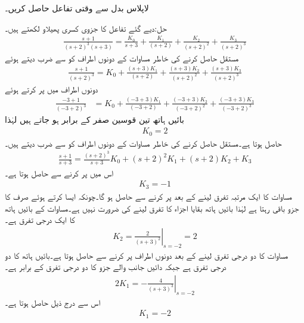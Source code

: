 لاپلاس بدل  سے وقتی تفاعل حاصل کریں۔

حل:دیے گئے تفاعل کا جزوی کسری پھیلاو لکھتے ہیں۔
\begin{align}\label{مساوات_لاپلاس_مثال_کثیر_قطبین_الف}
\frac{s+1}{(s+2)^3(s+3)}=\frac{K_0}{s+3}+\frac{K_1}{(s+2)}+\frac{K_2}{(s+2)^2}+\frac{K_3}{(s+2)^3}
\end{align}
مستقل  حاصل کرنے کی خاطر مساوات کے دونوں اطراف کو  سے ضرب دیتے ہوئے
\begin{align*}
\frac{s+1}{(s+2)^3}=K_0+\frac{(s+3)K_1}{(s+2)}+\frac{(s+3)K_2}{(s+2)^2}+\frac{(s+3)K_3}{(s+2)^3}
\end{align*}
دونوں اطراف میں  پر کرتے ہوئے
\begin{align*}
\frac{-3+1}{(-3+2)^3}&=K_0+\frac{(-3+3)K_1}{(-3+2)}+\frac{(-3+3)K_2}{(-3+2)^2}+\frac{(-3+3)K_3}{(-3+2)^3}
\end{align*}
 بائیں ہاتھ تین قوسین صفر کے برابر ہو جاتے ہیں لہٰذا
\begin{align*}
K_0=2
\end{align*}
حاصل ہوتا ہے۔مستقل  حاصل کرنے کی خاطر مساوات  کے دونوں اطراف کو  سے ضرب دیتے ہیں۔
\begin{align}\label{مساوات_لاپلاس_مثال_کثیر_قطبین_ب}
\frac{s+1}{s+3}=\frac{(s+2)^3}{s+3}K_0+(s+2)^2 K_1+(s+2)K_2+K_3
\end{align}
اس میں  پر کرنے سے  حاصل ہوتا ہے۔
\begin{align*}
K_3=-1
\end{align*}
مساوات  کا ایک مرتبہ تفرق لینے کے بعد  پر کرنے سے  حاصل ہو گا۔چونکہ ایسا کرتے ہوئے صرف  کا جزو باقی رہتا ہے لہٰذا بائیں ہاتھ بقایا اجزاء کا تفرق  لینے کی ضرورت نہیں ہے۔مساوات کے بائیں ہاتھ کا ایک درجی تفرق  ہے۔
\begin{align*}
K_2=\left. \frac{2}{(s+3)^2} \right|_{s=-2}=2
\end{align*}
مساوات  کا دو درجی تفرق لینے کے بعد دونوں اطراف  پر کرنے سے  حاصل ہوتا ہے۔بائیں ہاتھ کا دو درجی تفرق  ہے جبکہ دائیں جانب  والے جزو کا دو درجی تفرق  کے برابر ہے۔ 
\begin{align*}
2K_1=\left. -\frac{4}{(s+3)^3} \right|_{s=-2}
\end{align*}
اس سے درج ذیل حاصل ہوتا ہے۔
\begin{align*}
K_1=-2
\end{align*}
